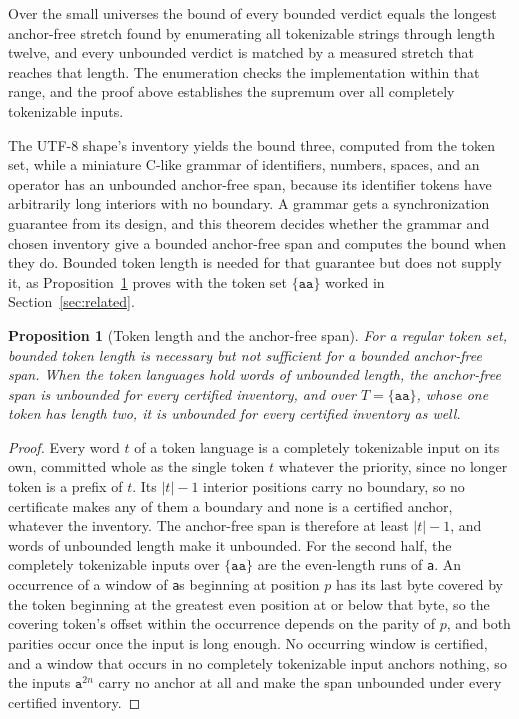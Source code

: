 \documentclass[11pt,a4paper]{article}
\theoremstyle{definition}
\theoremstyle{plain}
\newtheorem{proposition}{Proposition}
\newcommand{\code}[1]{\texttt{#1}}
\begin{document}
Over the small universes the bound of every bounded verdict equals the longest anchor-free stretch found by enumerating
all tokenizable strings through length twelve, and every unbounded verdict is matched by a measured stretch that reaches
that length. The enumeration checks the implementation within that range, and the proof above establishes the supremum
over all completely tokenizable inputs.

The UTF-8 shape's inventory yields the bound three, computed from the token set, while a miniature C-like grammar of
identifiers, numbers, spaces, and an operator has an unbounded anchor-free span, because its identifier tokens have
arbitrarily long interiors with no boundary. A grammar gets a synchronization guarantee from its design, and this
theorem decides whether the grammar and chosen inventory give a bounded anchor-free span and computes the bound when
they do. Bounded token length is needed for that guarantee but does not supply it, as Proposition~\ref{prop:length}
proves with the token set $\{\code{aa}\}$ worked in Section~\ref{sec:related}.

\begin{proposition}[Token length and the anchor-free span]\label{prop:length}
For a regular token set, bounded token length is necessary but not sufficient for a bounded anchor-free span. When the
token languages hold words of unbounded length, the anchor-free span is unbounded for every certified inventory, and
over $T = \{\code{aa}\}$, whose one token has length two, it is unbounded for every certified inventory as well.
\end{proposition}

\begin{proof}
Every word $t$ of a token language is a completely tokenizable input on its own, committed whole as the single token $t$
whatever the priority, since no longer token is a prefix of $t$. Its $|t| - 1$ interior positions carry no boundary, so
no certificate makes any of them a boundary and none is a certified anchor, whatever the inventory. The anchor-free span
is therefore at least $|t| - 1$, and words of unbounded length make it unbounded. For the second half, the completely
tokenizable inputs over $\{\code{aa}\}$ are the even-length runs of \code{a}. An occurrence of a window of \code{a}s
beginning at position $p$ has its last byte covered by the token beginning at the greatest even position at or below
that byte, so the covering token's offset within the occurrence depends on the parity of $p$, and both parities occur
once the input is long enough. No occurring window is certified, and a window that occurs in no completely tokenizable
input anchors nothing, so the inputs $\code{a}^{2n}$ carry no anchor at all and make the span unbounded under every
certified inventory.
\end{proof}
\end{document}
